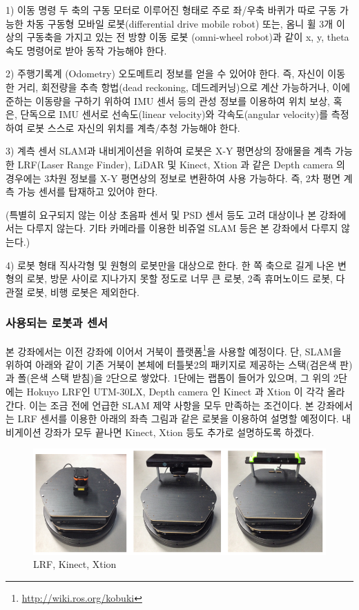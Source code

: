 1) 이동 명령
두 축의 구동 모터로 이루어진 형태로 주로 좌/우축 바퀴가 따로 구동 가능한 차동 구동형 모바일 로봇(differential drive mobile robot) 또는, 옴니 휠 3개 이상의 구동축을 가지고 있는 전 방향 이동 로봇 (omni-wheel robot)과 같이 x, y, theta 속도 명령어로 받아 동작 가능해야 한다.

2) 주행기록계 (Odometry)
오도메트리 정보를 얻을 수 있어야 한다. 즉, 자신이 이동한 거리, 회전량을 추측 항법(dead reckoning, 데드레커닝)으로 계산 가능하거나, 이에 준하는 이동량을 구하기 위하여 IMU 센서 등의 관성 정보를 이용하여 위치 보상, 혹은, 단독으로 IMU 센서로 선속도(linear velocity)와 각속도(angular velocity)를 측정하여 로봇 스스로 자신의 위치를 계측/추청 가능해야 한다.

3) 계측 센서
SLAM과 내비게이션을 위하여 로봇은 X-Y 평면상의 장애물을 계측 가능한 LRF(Laser Range Finder), LiDAR 및 Kinect, Xtion 과 같은 Depth camera 의 경우에는 3차원 정보를 X-Y 평면상의 정보로 변환하여 사용 가능하다. 즉, 2차 평면 계측 가능 센서를 탑재하고 있어야 한다. 

(특별히 요구되지 않는 이상 초음파 센서 및 PSD 센서 등도 고려 대상이나 본 강좌에서는 다루지 않는다. 기타 카메라를 이용한 비쥬얼 SLAM 등은 본 강좌에서 다루지 않는다.)

4) 로봇 형태
직사각형 및 원형의 로봇만을 대상으로 한다. 한 쪽 축으로 길게 나온 변형의 로봇, 방문 사이로 지나가지 못할 정도로 너무 큰 로봇, 2족 휴머노이드 로봇, 다관절 로봇, 비행 로봇은 제외한다.

\subsubsection{사용되는 로봇과 센서}

본 강좌에서는 이전 강좌에 이어서 거북이 플랫폼\footnote{\url{http://wiki.ros.org/kobuki}}을 사용할 예정이다. 단, SLAM을 위하여 아래와 같이 기존 거북이 본체에 터틀봇2의 패키지로 제공하는 스택(검은색 판)과 폴(은색 스택 받침)을 2단으로 쌓았다. 1단에는 랩톱이 들어가 있으며, 그 위의 2단에는 Hokuyo LRF인 UTM-30LX, Depth camera 인 Kinect 과 Xtion 이 각각 올라간다. 이는 조금 전에 언급한 SLAM 제약 사항을 모두 만족하는 조건이다. 본 강좌에서는 LRF 센서를 이용한 아래의 좌측 그림과 같은 로봇을 이용하여 설명할 예정이다. 내비게이션 강좌가 모두 끝나면 Kinect, Xtion 등도 추가로 설명하도록 하겠다.

\begin{figure}[h]
\centering
\includegraphics[width=0.9\columnwidth]{pictures/chapter11/kobuki_sensors.png}
\caption{LRF, Kinect, Xtion}
\end{figure}

